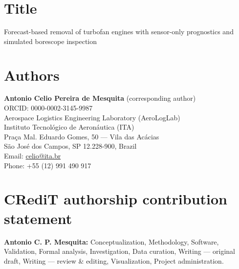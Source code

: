\documentclass[12pt]{article}
\begin{document}
\singlespacing

\section*{Title}
Forecast-based removal of turbofan engines with sensor-only prognostics and simulated borescope inspection

\section*{Authors}
\textbf{Antonio Celio Pereira de Mesquita} (corresponding author)\\
ORCID: 0000-0002-3145-9987\\
Aerospace Logistics Engineering Laboratory (AeroLogLab)\\
Instituto Tecnol\'{o}gico de Aeron\'{a}utica (ITA)\\
Pra\c{c}a Mal. Eduardo Gomes, 50 --- Vila das Ac\'{a}cias\\
S\~{a}o Jos\'{e} dos Campos, SP 12.228-900, Brazil\\
Email: \href{mailto:celio@ita.br}{celio@ita.br}\\
Phone: +55 (12) 991 490 917

\section*{CRediT authorship contribution statement}
\textbf{Antonio C. P. Mesquita:} Conceptualization,
Methodology, Software, Validation, Formal analysis, Investigation, Data
curation, Writing --- original draft, Writing --- review \& editing,
Visualization, Project administration.
\end{document}
